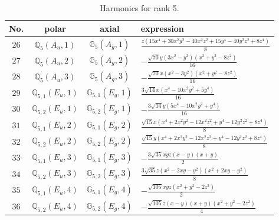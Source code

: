 \documentclass[fleqn,8pt,landscape]{jsarticle}
\begin{document}
\begin{table}[ht!]
\begin{center}
\caption{Harmonics for rank 5.}
\renewcommand{\arraystretch}{1.3}
\begin{tabular}{cccl} \hline \hline
No. & polar & axial & expression \\ \hline
$ 26 $ & $ \mathbb{Q}_{5}(A_{u},1) $ & $ \mathbb{G}_{5}(A_{g},1) $ & $ \frac{z \left(15 x^{4} + 30 x^{2} y^{2} - 40 x^{2} z^{2} + 15 y^{4} - 40 y^{2} z^{2} + 8 z^{4}\right)}{8} $ \\
$ 27 $ & $ \mathbb{Q}_{5}(A_{u},2) $ & $ \mathbb{G}_{5}(A_{g},2) $ & $ - \frac{\sqrt{70} y \left(3 x^{2} - y^{2}\right) \left(x^{2} + y^{2} - 8 z^{2}\right)}{16} $ \\
$ 28 $ & $ \mathbb{Q}_{5}(A_{u},3) $ & $ \mathbb{G}_{5}(A_{g},3) $ & $ - \frac{\sqrt{70} x \left(x^{2} - 3 y^{2}\right) \left(x^{2} + y^{2} - 8 z^{2}\right)}{16} $ \\
$ 29 $ & $ \mathbb{Q}_{5,1}(E_{u},1) $ & $ \mathbb{G}_{5,1}(E_{g},1) $ & $ \frac{3 \sqrt{14} x \left(x^{4} - 10 x^{2} y^{2} + 5 y^{4}\right)}{16} $ \\
$ 30 $ & $ \mathbb{Q}_{5,2}(E_{u},1) $ & $ \mathbb{G}_{5,2}(E_{g},1) $ & $ - \frac{3 \sqrt{14} y \left(5 x^{4} - 10 x^{2} y^{2} + y^{4}\right)}{16} $ \\
$ 31 $ & $ \mathbb{Q}_{5,1}(E_{u},2) $ & $ \mathbb{G}_{5,1}(E_{g},2) $ & $ \frac{\sqrt{15} x \left(x^{4} + 2 x^{2} y^{2} - 12 x^{2} z^{2} + y^{4} - 12 y^{2} z^{2} + 8 z^{4}\right)}{8} $ \\
$ 32 $ & $ \mathbb{Q}_{5,2}(E_{u},2) $ & $ \mathbb{G}_{5,2}(E_{g},2) $ & $ \frac{\sqrt{15} y \left(x^{4} + 2 x^{2} y^{2} - 12 x^{2} z^{2} + y^{4} - 12 y^{2} z^{2} + 8 z^{4}\right)}{8} $ \\
$ 33 $ & $ \mathbb{Q}_{5,1}(E_{u},3) $ & $ \mathbb{G}_{5,1}(E_{g},3) $ & $ - \frac{3 \sqrt{35} x y z \left(x - y\right) \left(x + y\right)}{2} $ \\
$ 34 $ & $ \mathbb{Q}_{5,2}(E_{u},3) $ & $ \mathbb{G}_{5,2}(E_{g},3) $ & $ \frac{3 \sqrt{35} z \left(x^{2} - 2 x y - y^{2}\right) \left(x^{2} + 2 x y - y^{2}\right)}{8} $ \\
$ 35 $ & $ \mathbb{Q}_{5,1}(E_{u},4) $ & $ \mathbb{G}_{5,1}(E_{g},4) $ & $ - \frac{\sqrt{105} x y z \left(x^{2} + y^{2} - 2 z^{2}\right)}{2} $ \\
$ 36 $ & $ \mathbb{Q}_{5,2}(E_{u},4) $ & $ \mathbb{G}_{5,2}(E_{g},4) $ & $ - \frac{\sqrt{105} z \left(x - y\right) \left(x + y\right) \left(x^{2} + y^{2} - 2 z^{2}\right)}{4} $ \\
 \hline \hline
\end{tabular}
\end{center}
\end{table}
\end{document}
